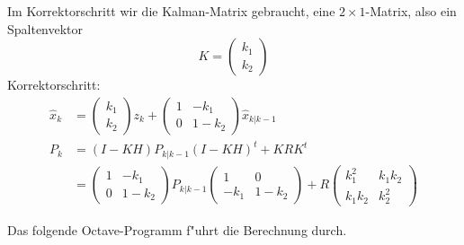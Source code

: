 \begin{loesung}
\begin{teilaufgaben}
Im Korrektorschritt wir die Kalman-Matrix gebraucht, eine
$2\times 1$-Matrix, also ein Spaltenvektor
\[
K=
\begin{pmatrix}k_1\\k_2\end{pmatrix}
\]
Korrektorschritt:
\begin{align*}
\hat x_k
&=
\begin{pmatrix}k_1\\k_2\end{pmatrix}z_k
+
\begin{pmatrix}
1&-k_1\\
0&1-k_2
\end{pmatrix}
\hat x_{k|k-1}
\\
P_k
&=
(I-KH)P_{k|k-1}(I-KH)^t+KRK^t
\\
&=
\begin{pmatrix}
1&-k_1\\
0&1-k_2
\end{pmatrix}
P_{k|k-1}
\begin{pmatrix}
1&0\\
-k_1&1-k_2
\end{pmatrix}
+
R
\begin{pmatrix}
k_1^2&k_1k_2\\
k_1k_2&k_2^2
\end{pmatrix}
\end{align*}
\item
Das folgende Octave-Programm f"uhrt die Berechnung durch.
\qedhere
\end{teilaufgaben}
\end{loesung}

